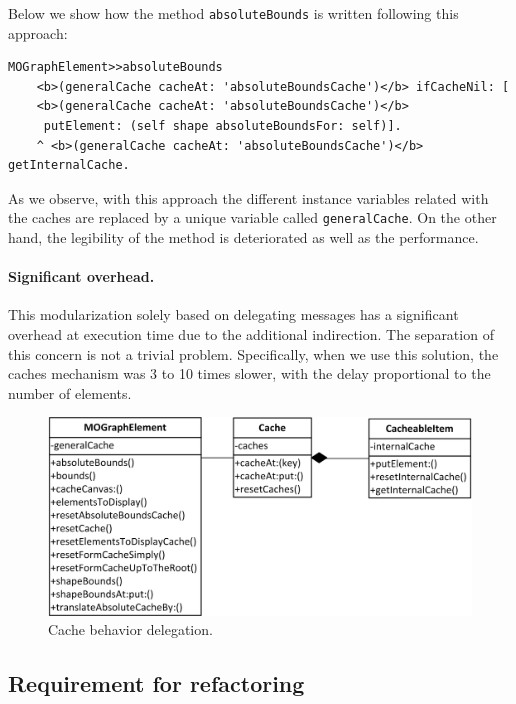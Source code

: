 \documentclass[preprint,10pt]{sigplanconf}
\newcommand{\ct}{\lstinline[backgroundcolor=\color{white},basicstyle=\footnotesize\ttfamily]}
\begin{document}
Below we show how the method \ct{absoluteBounds} is written following this approach:  
\begin{lstlisting} 
MOGraphElement>>absoluteBounds
	<b>(generalCache cacheAt: 'absoluteBoundsCache')</b> ifCacheNil: [
	<b>(generalCache cacheAt: 'absoluteBoundsCache')</b>
	 putElement: (self shape absoluteBoundsFor: self)].
	^ <b>(generalCache cacheAt: 'absoluteBoundsCache')</b> getInternalCache.
\end{lstlisting}
As we observe, with this approach the different instance variables related with the caches are replaced by a unique variable called \ct{generalCache}. On the other hand, the legibility of the method is deteriorated as well as the performance.

\paragraph{Significant overhead.} This modularization solely based on delegating messages has a significant overhead at execution time
due to the additional indirection.
The separation of this concern is not a trivial problem. Specifically,
when we use this solution, the caches mechanism was 3 to 10 times slower,
with the delay proportional to the number of elements.

%
\begin{figure}
\begin{centering}
\includegraphics[bb=27bp 615bp 338bp 762bp,scale=0.97]{CacheMechanisms} 
\par\end{centering}

\caption{Cache behavior delegation.\label{fig:Cache-behaviour-delegation}}

\end{figure}


\subsection{Requirement for refactoring}
\end{document}
